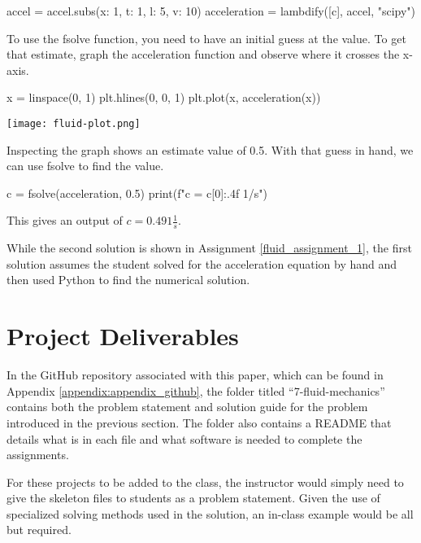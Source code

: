 \begin{tcolorbox}[breakable, enhanced jigsaw, title=ME 571: Assignment \ref{fluid_assignment_1}, 
    colframe=ksu-purple, colback=ksu-gray]
\begin{python}
accel = accel.subs({x: 1, t: 1, l: 5, v: 10})
acceleration = lambdify([c], accel, "scipy")
\end{python}

To use the fsolve function, you need to have an initial guess at the value. To get that
estimate, graph the acceleration function and observe where it crosses the x-axis.

\begin{python}
x = linspace(0, 1)
plt.hlines(0, 0, 1)
plt.plot(x, acceleration(x))
\end{python}

\begin{center}
    \texttt{[image: fluid-plot.png]}
\end{center}

Inspecting the graph shows an estimate value of 0.5. With that guess in hand, 
we can use fsolve to find the value.

\begin{python}
c = fsolve(acceleration, 0.5)
print(f"c = {c[0]:.4f} 1/s")
\end{python}

This gives an output of $ c = 0.491 \frac{1}{s} $.
\end{tcolorbox}

While the second solution is shown in Assignment \ref{fluid_assignment_1}, the first solution
assumes the student solved for the acceleration equation by hand and then used Python to
find the numerical solution.

\section{Project Deliverables}

In the GitHub repository associated with this paper, which can be found in 
Appendix \ref{appendix:appendix_github}, the folder titled ``7-fluid-mechanics''
contains both the problem statement and solution guide for the problem introduced in 
the previous section. The folder also contains a README that details what is in each file and 
what software is needed to complete the assignments. 

For these projects to be added to the class, the instructor would simply need to give the 
skeleton files to students as a problem statement. Given the use of specialized solving
methods used in the solution, an in-class example would be all but required.
